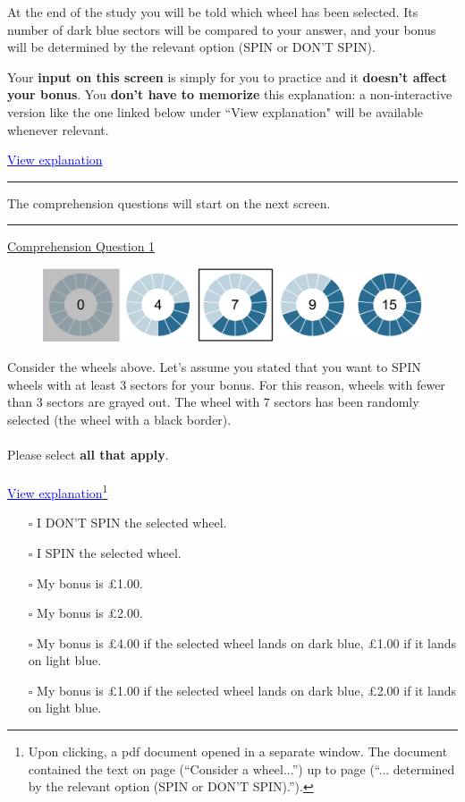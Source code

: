 \documentclass[pdftex,12pt, a4paper]{article}
\begin{document}
\noindent At the end of the study you will be told which wheel has been selected.
Its number of dark blue sectors will be compared to your answer, and your bonus will be determined by the relevant option (SPIN or DON'T SPIN).\label{end}

\noindent Your \textbf{input on this screen} is simply for you to practice and it \textbf{doesn't affect your bonus}.
You \textbf{don't have to memorize} this explanation: a non-interactive version like the one linked below under ``View explanation" will be available whenever relevant.

\noindent \textcolor{blue}{\underline{View explanation}}

\bigskip
\noindent \rule{\linewidth}{0.4pt}

\noindent The comprehension questions will start on the next screen.

\bigskip
\noindent \rule{\linewidth}{0.4pt}

\noindent \underline{Comprehension Question 1}

\begin{figure}[h!]
	\centering
	{\includegraphics[width=\linewidth]{Fig6_five_wheelsS1_15.pdf}}
\end{figure}
 
\noindent Consider the wheels above.
Let's assume you stated that you want to SPIN wheels with at least 3 sectors for your bonus.
For this reason, wheels with fewer than 3 sectors are grayed out.
The wheel with 7 sectors has been randomly selected (the wheel with a black border).\\
\\
\noindent Please select \textbf{all that apply}.\\
 \\
\noindent \textcolor{blue}{\underline{View explanation}}\footnote{
Upon clicking, a pdf document opened in a separate window.
The document contained the text on page \pageref{explanation} (``Consider a wheel...'') up to page \pageref{end} (``... determined by the relevant option (SPIN or DON'T SPIN).'').
}\\
\begin{itemize}
\item[$\square$] I DON'T SPIN the selected wheel.
\item[$\square$] I SPIN the selected wheel.
\item[$\square$] My bonus is £1.00.
\item[$\square$] My bonus is £2.00.
\item[$\square$] My bonus is £4.00 if the selected wheel lands on dark blue, £1.00 if it lands on light blue.
\item[$\square$] My bonus is £1.00 if the selected wheel lands on dark blue, £2.00 if it lands on light blue.
\end{itemize}
\end{document}
